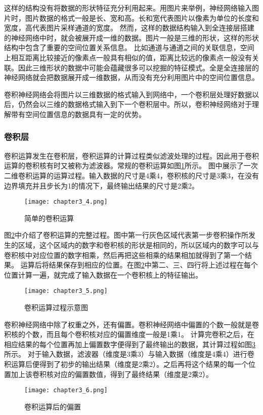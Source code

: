 这样的结构没有将数据的形状特征充分利用起来。用图片来举例，神经网络输入图片时，图片数据的格式一般是长、宽和高。长和宽代表图片以像素为单位的长度和宽度，高代表图片采样通道的宽度。
然而，这样的数据结构输入到全连接层搭建的神经网络中时，就会被展开成一维的数据。图片一般是三维的形状，这样的形状结构中包含了重要的空间位置关系信息。
比如通道与通道之间的关联信息，空间上相互距离比较接近的像素点一般具有相似的值，距离比较远的像素点一般没有关联。因此三维形状的数据中可能会蕴藏很多可以挖掘的特征模式。全是全连接层的神经网络就会把数据展开成一维数据，从而没有充分利用图片中的空间位置信息。

卷积神经网络会将图片以三维数据的格式输入到网络中，一个卷积层处理好数据以后，仍然会以三维的数据格式输入到下一个卷积层中。所以，卷积神经网络对于理解带有空间位置信息的数据具有一定的优势。

\subsubsection{卷积层}
卷积运算发生在卷积层，卷积运算的计算过程类似滤波处理的过程。因此用于卷积运算的卷积核有时又被称为滤波器。常规的卷积运算如图\ref{fig:chapter3_4}所示。
图中展示了一次二维卷积运算的运算过程。输入数据的尺寸是4乘4，卷积核的尺寸是3乘3，在没有边界填充并且步长为1的情况下，最终输出结果的尺寸是2乘2。
\begin{figure}
    \centering
    \texttt{[image: chapter3\_4.png]}
    \caption{简单的卷积运算}
    \label{fig:chapter3_4}
\end{figure}

图\ref{fig:chapter3_5}中介绍了卷积运算的完整过程。图中第一行灰色区域代表第一步卷积操作所发生的区域，这个区域内的数字和卷积核的形状是相同的，所以区域内的数字可以与卷积核中对应位置的数字相乘，然后再把这些相乘的结果相加就得到了第一个结果。
运算后将结果保存到相应的位置。在图\ref{fig:chapter3_5}中第二、三、四行将上述过程在每个位置计算一遍，就完成了输入数据在一个卷积核上的特征输出。
\begin{figure}
    \centering
    \texttt{[image: chapter3\_5.png]}
    \caption{卷积运算过程示意图}
    \label{fig:chapter3_5}
\end{figure}

卷积神经网络中除了权重之外，还有偏置。卷积神经网络中偏置的个数一般就是卷积核的个数，而且每个卷积核对应的偏置维度一般是1乘1。
计算完卷积之后，在相应结果的每个位置再加上偏置数字便得到了最终输出的数据，其计算过程如图\ref{fig:chapter3_6}所示。
对于输入数据，滤波器（维度是3乘3）与输入数据（维度是4乘4）进行卷积运算后便得到了初步的输出结果（维度是2乘2）。之后再将这个结果的每一个位置加上该卷积核对应的偏置数值，得到了最终结果（维度是2乘2）。
\begin{figure}
    \centering
    \texttt{[image: chapter3\_6.png]}
    \caption{卷积运算后的偏置}
    \label{fig:chapter3_6}
\end{figure}


